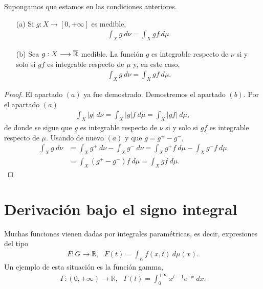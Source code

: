 \begin{teo}
    Supongamos que estamos en las condiciones anteriores.
    \begin{enumerate}
        \item[(a)] Si $g: X \longrightarrow [0,+\infty]$ es medible,
              \begin{align*}
                  \int_{X}{g \ d\nu} = \int_{X}{gf \ d\mu}.
              \end{align*}
        \item[(b)] Sea $g: X \longrightarrow \overline{\mathbb{R}}$ medible. La función $g$ es integrable respecto de $\nu$ si y solo si $gf$ es integrable respecto de $\mu$ y, en este caso,
              \begin{align*}
                  \int_{X}{g \ d\nu} = \int_{X}{gf \ d\mu}.
              \end{align*}
    \end{enumerate}
\end{teo}

\begin{proof}
    El apartado $(a)$ ya fue demostrado. Demostremos el apartado $(b)$. Por el apartado $(a)$
    \begin{align*}
        \int_{X}{|g| \ d\nu} = \int_{X}{|g|f \ d\mu} = \int_{X}{|gf| \ d\mu},
    \end{align*}
    de donde se sigue que $g$ es integrable respecto de $\nu$ si y solo si $gf$ es integrable respecto de $\mu$. Usando de nuevo $(a)$ y que $g = g^+ - g^-$,
    \begin{align*}
        \int_{X}{g \ d\nu} & = \int_{X}{g^+ \ d\nu} - \int_{X}{g^- \ d\nu} = \int_{X}{g^+f \ d\mu} - \int_{X}{g^-f \ d\mu} \\
                           & = \int_{X}{(g^+ - g^-)f \ d\mu} = \int_{X}{gf \ d\mu}.
    \end{align*}
\end{proof}

\section{Derivación bajo el signo integral}
Muchas funciones vienen dadas por integrales paramétricas, es decir, expresiones del tipo
\begin{align*}
    F: G \longrightarrow \mathbb{R}, \ \ \ F(t) = \int_{E}{f(x,t) \ d\mu(x)}.
\end{align*}
Un ejemplo de esta situación es la función gamma,
\begin{align*}
    \Gamma: (0,+\infty) \longrightarrow \mathbb{R}, \ \ \ \Gamma(t) = \int_{0}^{+\infty}{x^{t-1}e^{-x} \ dx}.
\end{align*}

